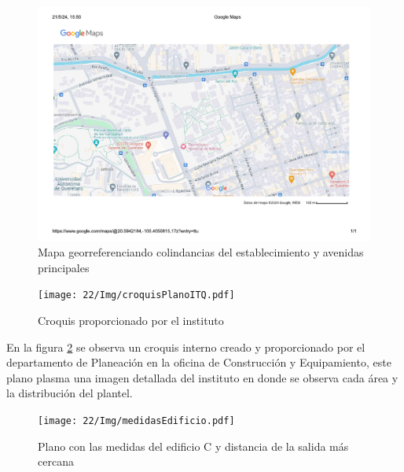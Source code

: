    \begin{figure}[H] 
        \centering
        \includegraphics[trim = {1mm 20mm 1mm 10mm},clip,scale=0.4]{22/Img/planoDeUbicacionEnMaps.pdf}
        \caption{Mapa georreferenciando colindancias del establecimiento y avenidas principales}
        \label{fig:mapa}
    \end{figure}
    
    \begin{figure}[H] 
        \centering
        \texttt{[image: 22/Img/croquisPlanoITQ.pdf]}
        \caption{Croquis proporcionado por el instituto}
        \label{fig:croquisPlano}
    \end{figure}
    
    En la figura \ref{fig:croquisPlano} se observa un croquis interno creado y proporcionado por el departamento de Planeación en la oficina de Construcción y Equipamiento, este plano plasma una imagen detallada del instituto en donde se observa cada área y la distribución del plantel. 
    
    
    \begin{figure}[H] 
        \centering
        \texttt{[image: 22/Img/medidasEdificio.pdf]}
        \caption{Plano con las medidas del edificio C y distancia de la salida más cercana}
        \label{fig:medidas}
    \end{figure}
    
    
    
